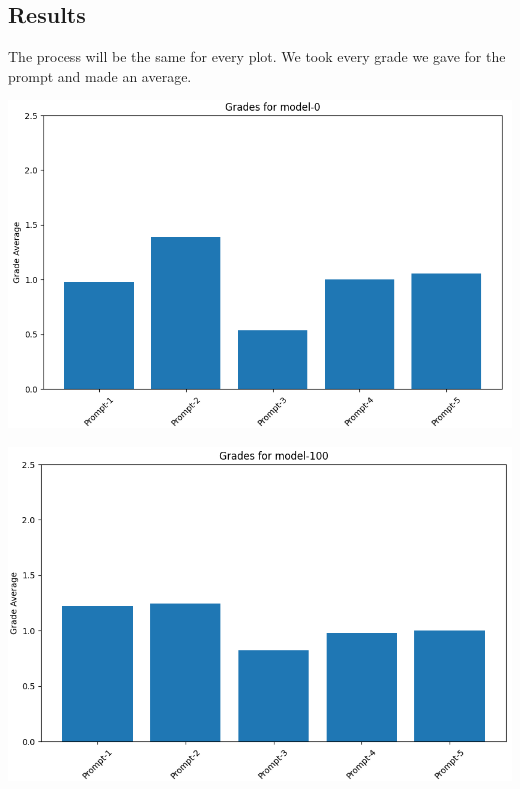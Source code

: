 \documentclass[12pt]{article}
\begin{document}
\subsection{Results}
The process will be the same for every plot. We took every grade we gave for the prompt and made an average.
\begin{center}
    \centering
    \begin{minipage}{0.49\textwidth}
        \centering
        \includegraphics[width=\textwidth]{img/plots/model-0-grades.png}
    \end{minipage} 
    \hfill
    \begin{minipage}{0.49\textwidth}
        \centering
        \includegraphics[width=\textwidth]{img/plots/model-100-grades.png}
    \end{minipage}
    
    \vspace{1em}


\end{center}
\end{document}

